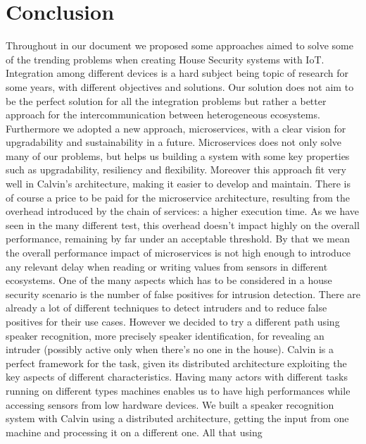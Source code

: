 \chapter{Conclusion}
\label{chap5}
Throughout in our document we proposed some approaches aimed
to solve some of the trending problems when creating House Security systems
with IoT. \newline
Integration among different devices is a hard subject being topic of research
for some years, with different objectives and solutions. Our solution does not aim
to be the perfect solution for all the integration problems but rather
a better approach for the intercommunication between heterogeneous ecosystems.
Furthermore we adopted a new approach, microservices, with a clear vision for
upgradability and sustainability in a future. Microservices does not only
solve many of our problems, but helps us building a system with some key
properties such as upgradability, resiliency and flexibility. Moreover
this approach fit very well in Calvin's architecture, making it easier to develop
and maintain. There is of course a price to be paid for the microservice architecture,
resulting from the overhead introduced by the chain of services: a higher execution time.
As we have seen in the many different test, this overhead doesn't impact highly on the
overall performance, remaining by far under an acceptable threshold. By that we mean
the overall performance impact of microservices is not high enough to introduce
any relevant delay when reading or writing values from sensors in different
ecosystems.\newline
One of the many aspects which has to be considered in a house security scenario is the
number of false positives for intrusion detection. There are already a lot of different
techniques to detect intruders and to reduce false positives for their use cases.
However we decided to try a different path using speaker recognition, more precisely
speaker identification, for revealing an intruder (possibly active only when there's no one in the house).
Calvin is a perfect framework for the task, given its distributed architecture exploiting the
key aspects of different characteristics. Having many actors with different tasks
running on different types machines enables us to have high performances
while accessing sensors from low hardware devices.\newline
We built a speaker recognition system with Calvin using a distributed architecture,
getting the input from one machine and processing it on a different one. All that using
